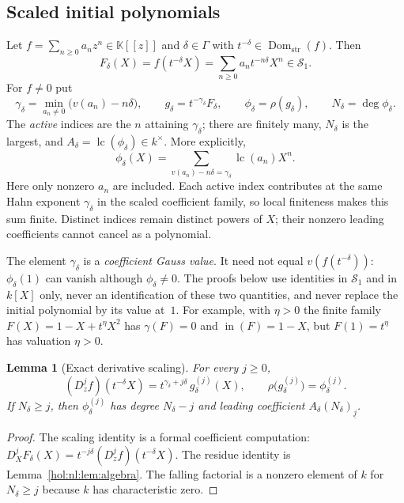 \documentclass[11pt]{article}
\numberwithin{equation}{section}
\newtheorem{lemma}[theorem]{Lemma}
\theoremstyle{definition}
\theoremstyle{remark}
\newcommand{\lc}{\operatorname{lc}}
\newcommand{\Dom}{\operatorname{Dom}_{\mathrm{str}}}
\newcommand{\fall}[2]{(#1)_{\underline{#2}}}
\newcommand{\KK}{\mathbb K}
\newcommand{\Sfam}{\mathcal S}
\newcommand{\inpoly}{\operatorname{in}}
\begin{document}
\subsection{Scaled initial polynomials}\label{hol:nl:sub:scaled}

Let $f=\sum_{n\ge0}a_nz^n\in\KK[[z]]$ and $\delta\in\Gamma$ with
$t^{-\delta}\in\Dom(f)$. Then
\[
 F_\delta(X)=f(t^{-\delta}X)=\sum_{n\ge0}a_nt^{-n\delta}X^n\in\Sfam_1.
\]
For $f\ne0$ put
\begin{equation}\label{hol:nl:eq:gaussdata}
 \gamma_\delta=\min_{a_n\ne0}\bigl(v(a_n)-n\delta\bigr),\qquad
 g_\delta=t^{-\gamma_\delta}F_\delta,\qquad
 \phi_\delta=\rho(g_\delta),\qquad
 N_\delta=\deg\phi_\delta.
\end{equation}
The \emph{active} indices are the $n$ attaining $\gamma_\delta$; there are
finitely many, $N_\delta$ is the largest, and $A_\delta=\lc(\phi_\delta)\in
k^\times$.
More explicitly,
\[
 \phi_\delta(X)=
 \sum_{v(a_n)-n\delta=\gamma_\delta}\lc(a_n)X^n.
\]
Here only nonzero $a_n$ are included. Each active index contributes at the
same Hahn exponent $\gamma_\delta$ in the scaled coefficient family, so
local finiteness makes this sum finite. Distinct indices remain distinct
powers of $X$; their nonzero leading coefficients cannot cancel as a
polynomial.

The element $\gamma_\delta$ is a \emph{coefficient Gauss value}. It need not
equal $v(f(t^{-\delta}))$: $\phi_\delta(1)$ can vanish although
$\phi_\delta\ne0$. The proofs below use identities in $\Sfam_1$ and in $k[X]$
only, never an identification of these two quantities, and never replace the
initial polynomial by its value at~$1$.
For example, with $\eta>0$ the finite family
$F(X)=1-X+t^\eta X^2$ has $\gamma(F)=0$ and $\inpoly(F)=1-X$,
but $F(1)=t^\eta$ has valuation $\eta>0$.

\begin{lemma}[Exact derivative scaling]\label{hol:nl:lem:derivatives}
For every $j\ge0$,
\begin{equation}\label{hol:nl:eq:scalederivative}
 (D_z^jf)(t^{-\delta}X)=t^{\gamma_\delta+j\delta}\,g_\delta^{(j)}(X),
 \qquad \rho\bigl(g_\delta^{(j)}\bigr)=\phi_\delta^{(j)}.
\end{equation}
If $N_\delta\ge j$, then $\phi_\delta^{(j)}$ has degree $N_\delta-j$ and
leading coefficient $A_\delta\fall{N_\delta}{j}$.
\end{lemma}

\begin{proof}
The scaling identity is a formal coefficient computation:
$D_X^jF_\delta(X)=t^{-j\delta}(D_z^jf)(t^{-\delta}X)$. The residue identity is
Lemma~\ref{hol:nl:lem:algebra}. The falling factorial is a nonzero element of
$k$ for $N_\delta\ge j$ because $k$ has characteristic zero.
\end{proof}
\end{document}
